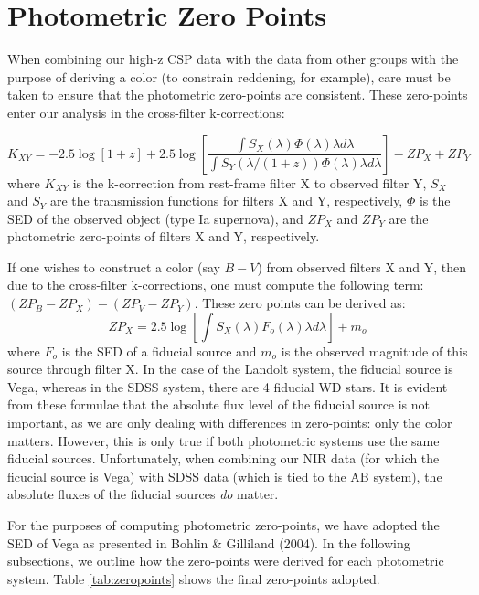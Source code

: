 \documentclass{aastex}
\begin{document}
\section{Photometric Zero Points}

When combining our high-z CSP data with the data from other groups
with the purpose of deriving a color (to constrain reddening, for
example), care must be taken to ensure that the photometric zero-points
are consistent. These zero-points enter our analysis in the cross-filter
k-corrections:

\[
K_{XY}=-2.5\log\left[1+z\right]+2.5\log\left[\frac{\int S_{X}\left(\lambda\right)\Phi\left(\lambda\right)\lambda d\lambda}{\int S_{Y}\left(\lambda/\left(1+z\right)\right)\Phi\left(\lambda\right)\lambda d\lambda}\right]-ZP_{X}+ZP_{Y}\]
where $K_{XY}$ is the k-correction from rest-frame filter X to observed
filter Y, $S_{X}$ and $S_{Y}$ are the transmission functions for
filters X and Y, respectively, $\Phi$ is the SED of the observed
object (type Ia supernova), and $ZP_{X}$ and $ZP_{Y}$ are the photometric
zero-points of filters X and Y, respectively.

If one wishes to construct a color (say $B-V$) from observed filters
X and Y, then due to the cross-filter k-corrections, one must compute
the following term: $\left(ZP_{B}-ZP_{X}\right)-\left(ZP_{V}-ZP_{Y}\right)$.
These zero points can be derived as:\[
ZP_{X}=2.5\log\left[\int S_{X}\left(\lambda\right)F_{o}\left(\lambda\right)\lambda d\lambda\right]+m_{o}\]
where $F_{o}$ is the SED of a fiducial source and $m_{o}$ is the
observed magnitude of this source through filter X. In the case of
the Landolt system, the fiducial source is Vega, whereas in the SDSS
system, there are 4 fiducial WD stars. It is evident from these formulae
that the absolute flux level of the fiducial source is not important,
as we are only dealing with differences in zero-points: only the color
matters. However, this is only true if both photometric systems use
the same fiducial sources. Unfortunately, when combining our NIR data
(for which the ficucial source is Vega) with SDSS data (which is tied
to the AB system), the absolute fluxes of the fiducial sources \emph{do}
matter.

For the purposes of computing photometric zero-points, we have adopted
the SED of Vega as presented in Bohlin \& Gilliland (2004). In the
following subsections, we outline how the zero-points were derived
for each photometric system. Table \ref{tab:zeropoints} shows the
final zero-points adopted.
\end{document}

